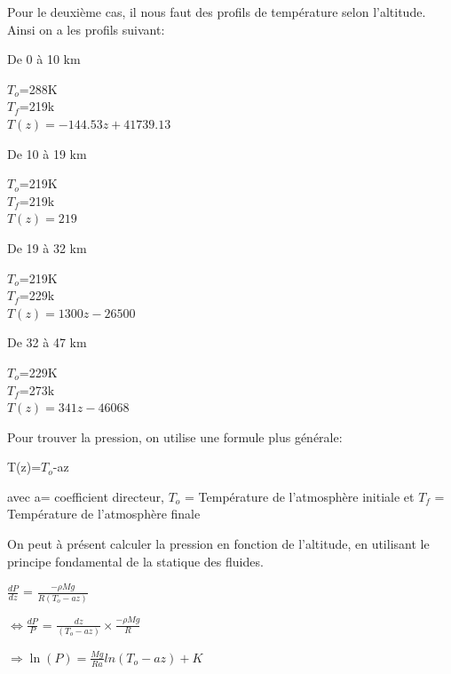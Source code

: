 \documentclass[a4paper, 12pt]{report} %
\begin{document}
Pour le deuxième cas, il nous faut des profils de température selon l'altitude.
Ainsi on a les profils suivant:

De 0 à 10 km 
\begin{center}
    $T_o$=288K\\
    $T_f$=219k\\
    $T(z)=-144.53z+41739.13$
\end{center}

De 10 à 19 km 
\begin{center}
    $T_o$=219K\\
    $T_f$=219k\\
    $T(z)=219$
\end{center}

De 19 à 32 km 
\begin{center}
    $T_o$=219K\\
    $T_f$=229k\\
    $T(z)=1300z-26500$
\end{center}

De 32 à 47 km 
\begin{center}
    $T_o$=229K\\
    $T_f$=273k\\
    $T(z)=341z-46068$
\end{center}

\noindent Pour trouver la pression, on utilise une formule plus générale:
\begin{center}
T(z)=$T_o$-az      
\end{center}

\noindent avec a= coefficient directeur, $T_o$ = Température de l'atmosphère initiale et $T_f$ = Température de l'atmosphère finale \vspace{\baselineskip}

On peut à présent calculer la pression en fonction de l'altitude, en utilisant le principe fondamental de la statique des fluides. 
\begin{center}
     $\frac{dP}{dz}$ = $\frac{-\rho Mg}{R(T_o-az)}$ 
\end{center}

\begin{center}
$\Leftrightarrow \frac{dP}{P}$ = $\frac{dz}{(T_o-az)} \times \frac{-\rho Mg}{R}$
\end{center}

\begin{center}
     $\Rightarrow \ln(P)=\frac{Mg}{Ra} ln(T_o-az)+K$\\
\end{center}
\end{document}
